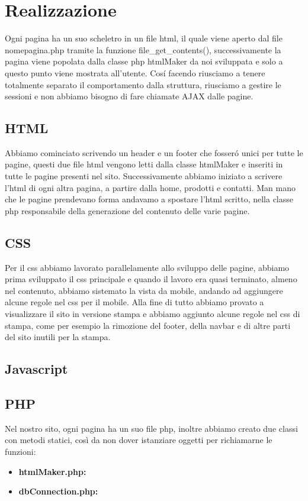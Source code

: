 \section{Realizzazione}
Ogni pagina ha un suo scheletro in un file html, il quale viene aperto dal file nome\textunderscore pagina.php tramite la funzione file_get_contents(), successivamente la pagina viene popolata dalla classe php htmlMaker da noi sviluppata e solo a questo punto viene mostrata all'utente. 
Cosí facendo riusciamo a tenere totalmente separato il comportamento dalla struttura, riusciamo a gestire le sessioni e non abbiamo bisogno di fare chiamate AJAX dalle pagine.
\subsection{HTML}
Abbiamo cominciato scrivendo un header e un footer che fosseró unici per tutte le pagine, questi due file html vengono letti dalla classe htmlMaker e inseriti in tutte le pagine presenti nel sito. Successivamente abbiamo iniziato a scrivere l'html di ogni altra pagina, a partire dalla home, prodotti e contatti. Man mano che le pagine prendevano forma andavamo a spostare l'html scritto, nella classe php responsabile della generazione del contenuto delle varie pagine.
\subsection{CSS}
Per il css abbiamo lavorato parallelamente allo sviluppo delle pagine, abbiamo prima sviluppato il css principale e quando il lavoro era quasi terminato, almeno nel contenuto, abbiamo sistemato la vista da mobile, andando ad aggiungere alcune regole nel css per il mobile. Alla fine di tutto abbiamo provato a visualizzare il sito in versione stampa e abbiamo aggiunto alcune regole nel css di stampa, come per esempio la rimozione del footer, della navbar e di altre parti del sito inutili per la stampa.
\subsection{Javascript}
\subsection{PHP}
Nel nostro sito, ogni pagina ha un suo file php, inoltre abbiamo creato due classi con metodi statici, così da non dover istanziare oggetti per richiamarne le funzioni:
\begin{itemize}
\item \textbf{htmlMaker.php:}
\item \textbf{dbConnection.php:}
\end{itemize}
